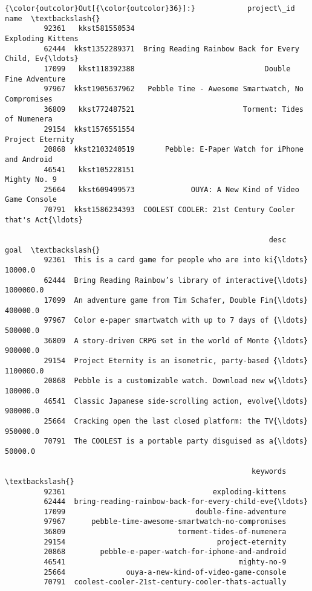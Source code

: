 \documentclass[11pt]{article}
\begin{document}
\begin{Verbatim}[commandchars=\\\{\}]
{\color{outcolor}Out[{\color{outcolor}36}]:}            project\_id                                               name  \textbackslash{}
         92361   kkst581550534                                  Exploding Kittens   
         62444  kkst1352289371  Bring Reading Rainbow Back for Every Child, Ev{\ldots}   
         17099   kkst118392388                              Double Fine Adventure   
         97967  kkst1905637962   Pebble Time - Awesome Smartwatch, No Compromises   
         36809   kkst772487521                         Torment: Tides of Numenera   
         29154  kkst1576551554                                   Project Eternity   
         20868  kkst2103240519       Pebble: E-Paper Watch for iPhone and Android   
         46541   kkst105228151                                       Mighty No. 9   
         25664   kkst609499573             OUYA: A New Kind of Video Game Console   
         70791  kkst1586234393  COOLEST COOLER: 21st Century Cooler that's Act{\ldots}   
         
                                                             desc       goal  \textbackslash{}
         92361  This is a card game for people who are into ki{\ldots}    10000.0   
         62444  Bring Reading Rainbow’s library of interactive{\ldots}  1000000.0   
         17099  An adventure game from Tim Schafer, Double Fin{\ldots}   400000.0   
         97967  Color e-paper smartwatch with up to 7 days of {\ldots}   500000.0   
         36809  A story-driven CRPG set in the world of Monte {\ldots}   900000.0   
         29154  Project Eternity is an isometric, party-based {\ldots}  1100000.0   
         20868  Pebble is a customizable watch. Download new w{\ldots}   100000.0   
         46541  Classic Japanese side-scrolling action, evolve{\ldots}   900000.0   
         25664  Cracking open the last closed platform: the TV{\ldots}   950000.0   
         70791  The COOLEST is a portable party disguised as a{\ldots}    50000.0   
         
                                                         keywords  \textbackslash{}
         92361                                  exploding-kittens   
         62444  bring-reading-rainbow-back-for-every-child-eve{\ldots}   
         17099                              double-fine-adventure   
         97967      pebble-time-awesome-smartwatch-no-compromises   
         36809                          torment-tides-of-numenera   
         29154                                   project-eternity   
         20868        pebble-e-paper-watch-for-iphone-and-android   
         46541                                        mighty-no-9   
         25664              ouya-a-new-kind-of-video-game-console   
         70791  coolest-cooler-21st-century-cooler-thats-actually   
         

\end{Verbatim}
\end{document}
